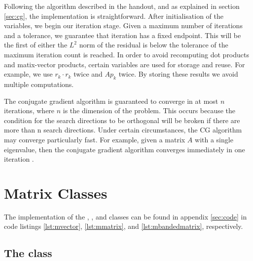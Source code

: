 Following the algorithm described in the handout, and as explained in section \ref{sec:cg}, the implementation is straightforward.
After initialisation of the variables, we begin our iteration stage. 
Given a maximum number of iterations and a tolerance, we guarantee that iteration has a fixed endpoint. 
This will be the first of either the $L^{2}$ norm of the residual is below the tolerance of the maximum iteration count is reached.
In order to avoid recomputing dot products and matix-vector products, certain variables are used for storage and reuse.
For example, we use $r_k \cdot r_k$ twice and $A p_k$ twice. 
By storing these results we avoid multiple computations.

The conjugate gradient algorithm is guaranteed to converge in at most $n$ iterations, where $n$ is the dimension of the problem.
This occurs because the condition for the search directions to be orthogonal will be broken if there are more than n search directions.
Under certain circumstances, the CG algorithm may converge particularly fast.
For example, given a matrix $A$ with a single eigenvalue, then the conjugate gradient algorithm converges immediately in one iteration \cite{cgpain}.


\section{Matrix Classes}
\label{sec:classes}

The implementation of the , , and  classes can be found in  appendix \ref{sec:code} in code listings \ref{lst:mvector}, \ref{lst:mmatrix}, and \ref{lst:mbandedmatrix}, respectively.

\subsection{The  class}

